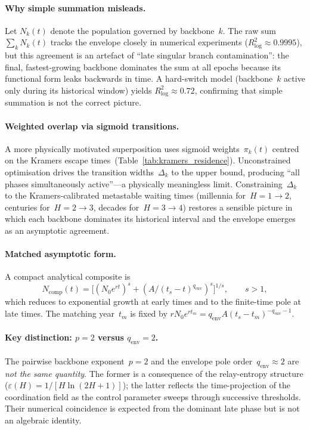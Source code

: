 \documentclass[11pt]{article}
\begin{document}
\paragraph{Why simple summation misleads.}
Let $N_k(t)$ denote the population governed by backbone~$k$.  The raw
sum $\sum_k N_k(t)$ tracks the envelope closely in numerical
experiments ($R^2_{\log}\approx 0.9995$), but this agreement is an
artefact of ``late singular branch contamination'': the final,
fastest-growing backbone dominates the sum at all epochs because its
functional form leaks backwards in time.  A hard-switch model
(backbone~$k$ active only during its historical window) yields
$R^2_{\log}\approx 0.72$, confirming that simple summation is not the
correct picture.

\paragraph{Weighted overlap via sigmoid transitions.}
A more physically motivated superposition uses sigmoid
weights~$\pi_k(t)$ centred on the Kramers escape
times~(Table~\ref{tab:kramers_residence}).  Unconstrained optimisation
drives the transition widths~$\Delta_k$ to the upper bound, producing
``all phases simultaneously active''---a physically meaningless limit.
Constraining~$\Delta_k$ to the Kramers-calibrated metastable waiting
times (millennia for~$H=1{\to}2$, centuries for~$H=2{\to}3$, decades
for~$H=3{\to}4$) restores a sensible picture in which each backbone
dominates its historical interval and the envelope emerges as an
asymptotic agreement.

\paragraph{Matched asymptotic form.}
A compact analytical composite is
\[
N_{\mathrm{comp}}(t)
  =\bigl[(N_0 e^{rt})^s + (A/(t_s-t)^{q_{\mathrm{env}}})^s\bigr]^{1/s},
  \qquad s>1,
\]
which reduces to exponential growth at early times and to the
finite-time pole at late times.  The matching year~$t_m$ is fixed by
$r N_0 e^{r t_m}=q_{\mathrm{env}} A (t_s-t_m)^{-q_{\mathrm{env}}-1}$.

\paragraph{Key distinction: $p=2$ versus $q_{\mathrm{env}}=2$.}
The pairwise backbone exponent~$p=2$ and the envelope pole
order~$q_{\mathrm{env}}\approx 2$ are \emph{not the same quantity}.  The
former is a consequence of the relay-entropy structure
($\varepsilon(H)=1/[H\ln(2H+1)]$); the latter reflects the
time-projection of the coordination field as the control parameter
sweeps through successive thresholds.  Their numerical coincidence is
expected from the dominant late phase but is not an algebraic identity.
\end{document}
